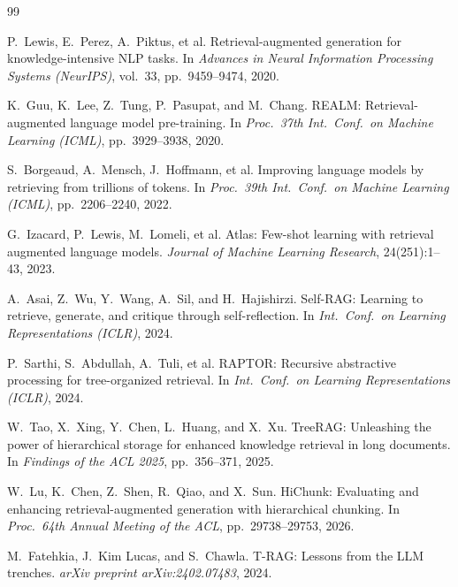 \documentclass[12pt,a4paper]{report}
\begin{document}
\clearpage
\renewcommand{\bibname}{REFERENCES}
{}
\begin{thebibliography}{99}

P.~Lewis, E.~Perez, A.~Piktus, et al.
Retrieval-augmented generation for knowledge-intensive NLP tasks.
In \textit{Advances in Neural Information Processing Systems (NeurIPS)}, vol.~33,
pp.~9459--9474, 2020.

K.~Guu, K.~Lee, Z.~Tung, P.~Pasupat, and M.~Chang.
REALM: Retrieval-augmented language model pre-training.
In \textit{Proc.\ 37th Int.\ Conf.\ on Machine Learning (ICML)}, pp.~3929--3938, 2020.

S.~Borgeaud, A.~Mensch, J.~Hoffmann, et al.
Improving language models by retrieving from trillions of tokens.
In \textit{Proc.\ 39th Int.\ Conf.\ on Machine Learning (ICML)}, pp.~2206--2240, 2022.

G.~Izacard, P.~Lewis, M.~Lomeli, et al.
Atlas: Few-shot learning with retrieval augmented language models.
\textit{Journal of Machine Learning Research}, 24(251):1--43, 2023.

A.~Asai, Z.~Wu, Y.~Wang, A.~Sil, and H.~Hajishirzi.
Self-RAG: Learning to retrieve, generate, and critique through self-reflection.
In \textit{Int.\ Conf.\ on Learning Representations (ICLR)}, 2024.

P.~Sarthi, S.~Abdullah, A.~Tuli, et al.
RAPTOR: Recursive abstractive processing for tree-organized retrieval.
In \textit{Int.\ Conf.\ on Learning Representations (ICLR)}, 2024.

W.~Tao, X.~Xing, Y.~Chen, L.~Huang, and X.~Xu.
TreeRAG: Unleashing the power of hierarchical storage for enhanced knowledge retrieval
in long documents.
In \textit{Findings of the ACL 2025}, pp.~356--371, 2025.

W.~Lu, K.~Chen, Z.~Shen, R.~Qiao, and X.~Sun.
HiChunk: Evaluating and enhancing retrieval-augmented generation with hierarchical
chunking.
In \textit{Proc.\ 64th Annual Meeting of the ACL}, pp.~29738--29753, 2026.

M.~Fatehkia, J.~Kim Lucas, and S.~Chawla.
T-RAG: Lessons from the LLM trenches.
\textit{arXiv preprint arXiv:2402.07483}, 2024.


\end{thebibliography}
\end{document}
